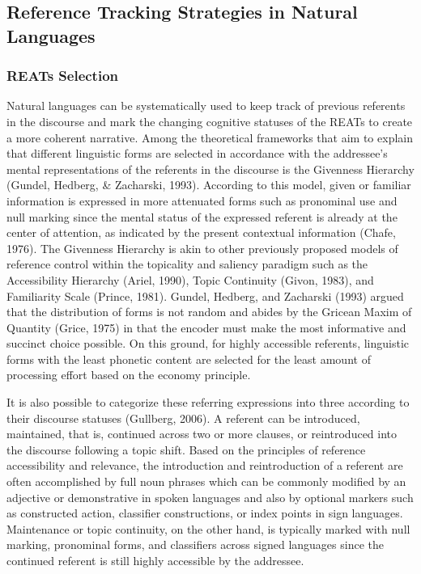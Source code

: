 \documentclass[
  english,
  doc,mask]{apa6}
\begin{document}
\hypertarget{reference-tracking-strategies-in-natural-languages}{%
\subsection{Reference Tracking Strategies in Natural Languages}\label{reference-tracking-strategies-in-natural-languages}}

\hypertarget{reats-selection}{%
\subsubsection{REATs Selection}\label{reats-selection}}

Natural languages can be systematically used to keep track of previous referents in the discourse and mark the changing cognitive statuses of the REATs to create a more coherent narrative. Among the theoretical frameworks that aim to explain that different linguistic forms are selected in accordance with the addressee's mental representations of the referents in the discourse is the Givenness Hierarchy (Gundel, Hedberg, \& Zacharski, 1993). According to this model, given or familiar information is expressed in more attenuated forms such as pronominal use and null marking since the mental status of the expressed referent is already at the center of attention, as indicated by the present contextual information (Chafe, 1976). The Givenness Hierarchy is akin to other previously proposed models of reference control within the topicality and saliency paradigm such as the Accessibility Hierarchy (Ariel, 1990), Topic Continuity (Givon, 1983), and Familiarity Scale (Prince, 1981). Gundel, Hedberg, and Zacharski (1993) argued that the distribution of forms is not random and abides by the Gricean Maxim of Quantity (Grice, 1975) in that the encoder must make the most informative and succinct choice possible. On this ground, for highly accessible referents, linguistic forms with the least phonetic content are selected for the least amount of processing effort based on the economy principle.

It is also possible to categorize these referring expressions into three according to their discourse statuses (Gullberg, 2006). A referent can be introduced, maintained, that is, continued across two or more clauses, or reintroduced into the discourse following a topic shift. Based on the principles of reference accessibility and relevance, the introduction and reintroduction of a referent are often accomplished by full noun phrases which can be commonly modified by an adjective or demonstrative in spoken languages and also by optional markers such as constructed action, classifier constructions, or index points in sign languages. Maintenance or topic continuity, on the other hand, is typically marked with null marking, pronominal forms, and classifiers across signed languages since the continued referent is still highly accessible by the addressee.
\end{document}

